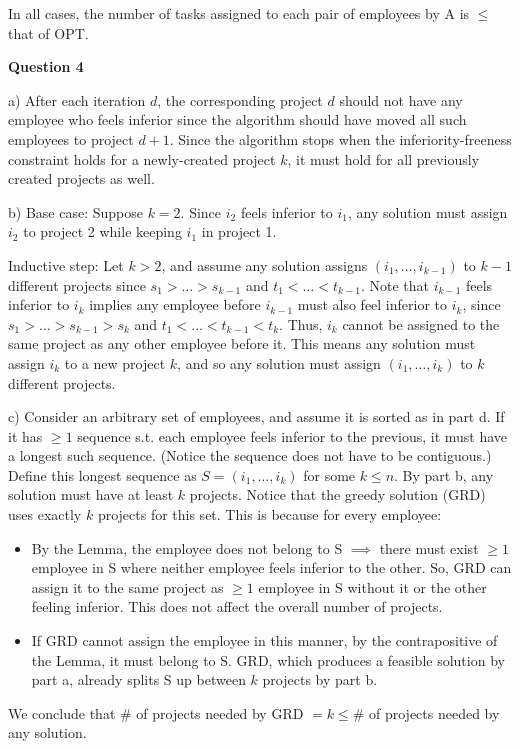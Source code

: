 \documentclass[11pt]{article}
\begin{document}
In all cases, the number of tasks assigned to each pair of employees by A is $\leq$ that of OPT.

\textbf{Question 4}

a) After each iteration $d$, the corresponding project $d$ should not have any employee who feels inferior since the algorithm should have moved all such employees to project $d+1$. Since the algorithm stops when the inferiority-freeness constraint holds for a newly-created project $k$, it must hold for all previously created projects as well.

b) Base case: Suppose $k=2$. Since $i_2$ feels inferior to $i_1$, any solution must assign $i_2$ to project 2 while keeping $i_1$ in project 1.

Inductive step: Let $k>2$, and assume any solution assigns $(i_1,\ldots,i_{k-1})$ to $k-1$ different projects since $s_1>\ldots>s_{k-1}$ and $t_1<\ldots<t_{k-1}$. Note that $i_{k-1}$ feels inferior to $i_k$ implies any employee before $i_{k-1}$ must also feel inferior to $i_k$, since $s_1>\ldots>s_{k-1}>s_k$ and $t_1<\ldots<t_{k-1}<t_k$. Thus, $i_k$ cannot be assigned to the same project as any other employee before it. This means any solution must assign $i_k$ to a new project $k$, and so any solution must assign $(i_1,\ldots,i_k)$ to $k$ different projects.

c) Consider an arbitrary set of employees, and assume it is sorted as in part d. If it has $\geq 1$ sequence s.t. each employee feels inferior to the previous, it must have a longest such sequence. (Notice the sequence does not have to be contiguous.) Define this longest sequence as $S=(i_1,\ldots,i_k)$ for some $k\leq n$. By part b, any solution must have at least $k$ projects. Notice that the greedy solution (GRD) uses exactly $k$ projects for this set. This is because for every employee:

\begin{itemize}
    \item By the Lemma, the employee does not belong to S $\implies$ there must exist $\geq 1$ employee in S where neither employee feels inferior to the other. So, GRD can assign it to the same project as $\geq 1$ employee in S without it or the other feeling inferior. This does not affect the overall number of projects.
    \item If GRD cannot assign the employee in this manner, by the contrapositive of the Lemma, it must belong to S. GRD, which produces a feasible solution by part a, already splits S up between $k$ projects by part b.
\end{itemize}We conclude that $\#$ of projects needed by GRD $=k\leq\#$ of projects needed by any solution.
\end{document}
